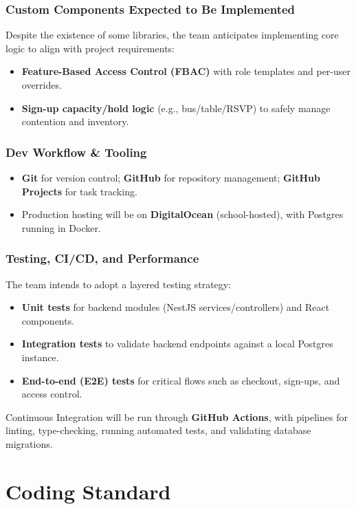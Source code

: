\documentclass{article}
\begin{document}
\subsubsection*{Custom Components Expected to Be Implemented} 
Despite the existence of some libraries, the team anticipates implementing core logic to align with project requirements:
\begin{itemize}
  \item \textbf{Feature-Based Access Control (FBAC)} with role templates and per-user overrides.
  \item \textbf{Sign-up capacity/hold logic} (e.g., bus/table/RSVP) to safely manage contention and inventory.
\end{itemize}

\subsubsection*{Dev Workflow \& Tooling}
\begin{itemize}
  \item \textbf{Git} for version control; \textbf{GitHub} for repository management; \textbf{GitHub Projects} for task tracking.
  \item Production hosting will be on \textbf{DigitalOcean} (school-hosted), with Postgres running in Docker.
\end{itemize}

\subsubsection*{Testing, CI/CD, and Performance} 
The team intends to adopt a layered testing strategy:
\begin{itemize}
  \item \textbf{Unit tests} for backend modules (NestJS services/controllers) and React components.
  \item \textbf{Integration tests} to validate backend endpoints against a local Postgres instance.
  \item \textbf{End-to-end (E2E) tests} for critical flows such as checkout, sign-ups, and access control.
\end{itemize}
Continuous Integration will be run through \textbf{GitHub Actions}, with pipelines for linting, type-checking, running automated tests, and validating database migrations.

\section{Coding Standard}
\end{document}
